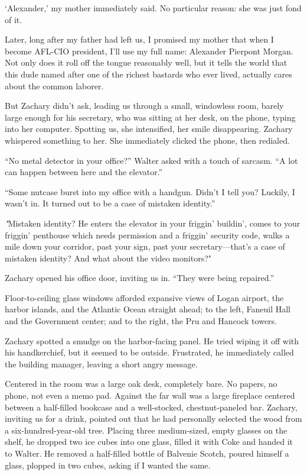 `Alexander,' my mother immediately said. No particular reason: she was
just fond of it.

Later, long after my father had left us, I promised my mother that when
I become AFL-CIO president, I'll use my full name: Alexander Pierpont
Morgan. Not only does it roll off the tongue reasonably well, but it
tells the world that this dude named after one of the richest bastards
who ever lived, actually cares about the common laborer.

But Zachary didn't ask, leading us through a small, windowless room,
barely large enough for his secretary, who was sitting at her desk, on
the phone, typing into her computer. Spotting us, she intensified, her
smile disappearing. Zachary whispered something to her. She immediately
clicked the phone, then redialed.

``No metal detector in your office?'' Walter asked with a touch of
sarcasm. ``A lot can happen between here and the elevator.''

``Some nutcase burst into my office with a handgun. Didn't I tell you?
Luckily, I wasn't in. It turned out to be a case of mistaken identity.''

\emph{"}Mistaken identity? He enters the elevator in your friggin'
buildin', comes to your friggin' penthouse which needs permission and a
friggin' security code, walks a mile down your corridor, past your sign,
past your secretary---that's a case of mistaken identity? And what about
the video monitors?"

Zachary opened his office door, inviting us in. ``They were being
repaired.''

Floor-to-ceiling glass windows afforded expansive views of Logan
airport, the harbor islands, and the Atlantic Ocean straight ahead; to
the left, Faneuil Hall and the Government center; and to the right, the
Pru and Hancock towers.

Zachary spotted a smudge on the harbor-facing panel. He tried wiping it
off with his handkerchief, but it seemed to be outside. Frustrated, he
immediately called the building manager, leaving a short angry message.

Centered in the room was a large oak desk, completely bare. No papers,
no phone, not even a memo pad. Against the far wall was a large
fireplace centered between a half-filled bookcase and a well-stocked,
chestnut-paneled bar. Zachary, inviting us for a drink, pointed out that
he had personally selected the wood from a six-hundred-year-old tree.
Placing three medium-sized, empty glasses on the shelf, he dropped two
ice cubes into one glass, filled it with Coke and handed it to Walter.
He removed a half-filled bottle of Balvenie Scotch, poured himself a
glass, plopped in two cubes, asking if I wanted the same.

